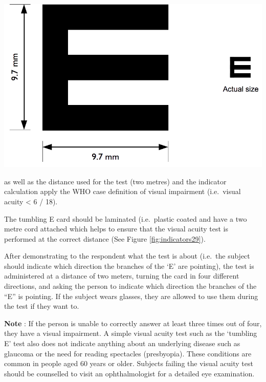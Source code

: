 \documentclass[12pt,a4paper]{book}
\theoremstyle{definition}
\theoremstyle{definition}
\theoremstyle{definition}
\theoremstyle{remark}
\begin{document}
\begin{center}\includegraphics{figures/indicators28} \end{center}

as well as the distance used for the test (two metres) and the indicator
calculation apply the WHO case definition of visual impairment
(i.e.~visual acuity \textless{} 6 / 18).

The tumbling E card should be laminated (i.e.~plastic coated and have a
two metre cord attached which helps to ensure that the visual acuity
test is performed at the correct distance (See Figure
\ref{fig:indicators29}).

After demonstrating to the respondent what the test is about (i.e.~the
subject should indicate which direction the branches of the `E' are
pointing), the test is administered at a distance of two meters, turning
the card in four different directions, and asking the person to indicate
which direction the branches of the ``E'' is pointing. If the subject
wears glasses, they are allowed to use them during the test if they want
to.

\textbf{Note} : If the person is unable to correctly answer at least
three times out of four, they have a visual impairment. A simple visual
acuity test such as the `tumbling E' test also does not indicate
anything about an underlying disease such as glaucoma or the need for
reading spectacles (presbyopia). These conditions are common in people
aged 60 years or older. Subjects failing the visual acuity test should
be counselled to visit an ophthalmologist for a detailed eye
examination.
\end{document}
